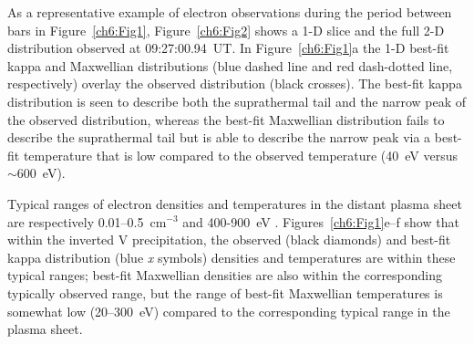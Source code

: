   \begin{figure}
    \centering {}
  \end{figure}


  As a representative example of electron observations during the period between
  bars in Figure~\ref{ch6:Fig1}, Figure~\ref{ch6:Fig2} shows a 1-D slice and the
  full 2-D distribution observed at 09:27:00.94~UT.  In Figure~\ref{ch6:Fig1}a
  the 1-D best-fit kappa and Maxwellian distributions (blue dashed line and red
  dash-dotted line, respectively) overlay the observed distribution (black
  crosses). The best-fit kappa distribution is seen to describe both the
  suprathermal tail and the narrow peak of the observed distribution, whereas
  the best-fit Maxwellian distribution fails to describe the suprathermal tail
  but is able to describe the narrow peak via a best-fit temperature that is low
  compared to the observed temperature (40~eV versus $\sim$600~eV).

  Typical ranges of electron densities and temperatures in the distant plasma
  sheet are respectively 0.01--0.5~cm$^{-3}$ and 400-900~eV
  \citep{Kletzing2003,Paschmann2003}. Figures~\ref{ch6:Fig1}e--f show that
  within the inverted V precipitation, the observed (black diamonds) and
  best-fit kappa distribution (blue \emph{x} symbols) densities and temperatures
  are within these typical ranges; best-fit Maxwellian densities are also within
  the corresponding typically observed range, but the range of best-fit
  Maxwellian temperatures is somewhat low (20--300~eV) compared to the
  corresponding typical range in the plasma sheet.

